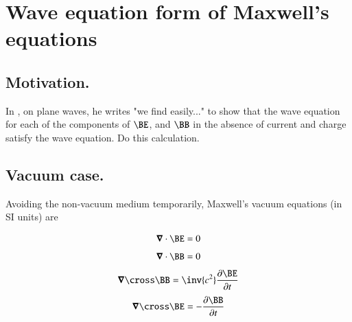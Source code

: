 
%
%
%




\chapter{Wave equation form of Maxwell's equations}\label{chap:emVacWave}

%


\section{Motivation.}

In \cite{jackson1975cew}, on plane waves, he writes "we find easily..." to show that the wave equation for each of the components
of $\BE$, and $\BB$ in the absence of current and charge satisfy the wave equation.  Do this calculation.

\section{Vacuum case.}

Avoiding the non-vacuum medium temporarily, Maxwell's vacuum equations (in SI units) are

\begin{align}\label{eqn:emVacWave:divE}
\spacegrad \cdot \BE = 0
\end{align}
\begin{align}\label{eqn:emVacWave:divB}
\spacegrad \cdot \BB = 0
\end{align}
\begin{align}\label{eqn:emVacWave:curlB}
\spacegrad \cross \BB = \inv{c^2} \frac{\partial \BE}{\partial t}
\end{align}
\begin{align}\label{eqn:emVacWave:curlE}
\spacegrad \cross \BE = -\frac{\partial \BB}{\partial t}
\end{align}

